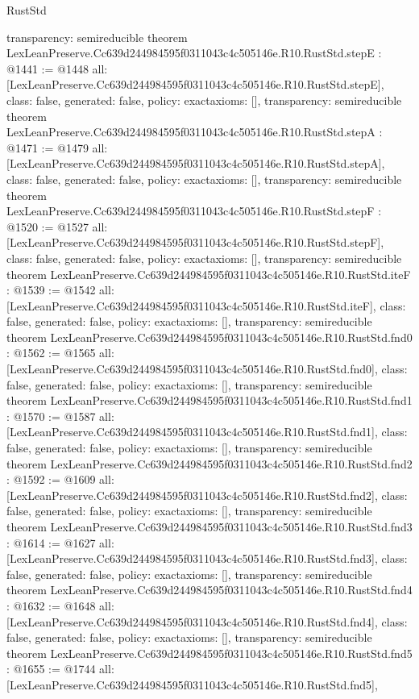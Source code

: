 \begin{lexlean}{RustStd}
\begin{coremodule}
{  transparency: semireducible
}
theorem LexLeanPreserve.Cc639d244984595f0311043c4c505146e.R10.RustStd.stepE : @1441 := @1448 {
  all: [LexLeanPreserve.Cc639d244984595f0311043c4c505146e.R10.RustStd.stepE],
  class: false,
  generated: false,
  policy: exact{axioms: []},
  transparency: semireducible
}
theorem LexLeanPreserve.Cc639d244984595f0311043c4c505146e.R10.RustStd.stepA : @1471 := @1479 {
  all: [LexLeanPreserve.Cc639d244984595f0311043c4c505146e.R10.RustStd.stepA],
  class: false,
  generated: false,
  policy: exact{axioms: []},
  transparency: semireducible
}
theorem LexLeanPreserve.Cc639d244984595f0311043c4c505146e.R10.RustStd.stepF : @1520 := @1527 {
  all: [LexLeanPreserve.Cc639d244984595f0311043c4c505146e.R10.RustStd.stepF],
  class: false,
  generated: false,
  policy: exact{axioms: []},
  transparency: semireducible
}
theorem LexLeanPreserve.Cc639d244984595f0311043c4c505146e.R10.RustStd.iteF : @1539 := @1542 {
  all: [LexLeanPreserve.Cc639d244984595f0311043c4c505146e.R10.RustStd.iteF],
  class: false,
  generated: false,
  policy: exact{axioms: []},
  transparency: semireducible
}
theorem LexLeanPreserve.Cc639d244984595f0311043c4c505146e.R10.RustStd.fnd0 : @1562 := @1565 {
  all: [LexLeanPreserve.Cc639d244984595f0311043c4c505146e.R10.RustStd.fnd0],
  class: false,
  generated: false,
  policy: exact{axioms: []},
  transparency: semireducible
}
theorem LexLeanPreserve.Cc639d244984595f0311043c4c505146e.R10.RustStd.fnd1 : @1570 := @1587 {
  all: [LexLeanPreserve.Cc639d244984595f0311043c4c505146e.R10.RustStd.fnd1],
  class: false,
  generated: false,
  policy: exact{axioms: []},
  transparency: semireducible
}
theorem LexLeanPreserve.Cc639d244984595f0311043c4c505146e.R10.RustStd.fnd2 : @1592 := @1609 {
  all: [LexLeanPreserve.Cc639d244984595f0311043c4c505146e.R10.RustStd.fnd2],
  class: false,
  generated: false,
  policy: exact{axioms: []},
  transparency: semireducible
}
theorem LexLeanPreserve.Cc639d244984595f0311043c4c505146e.R10.RustStd.fnd3 : @1614 := @1627 {
  all: [LexLeanPreserve.Cc639d244984595f0311043c4c505146e.R10.RustStd.fnd3],
  class: false,
  generated: false,
  policy: exact{axioms: []},
  transparency: semireducible
}
theorem LexLeanPreserve.Cc639d244984595f0311043c4c505146e.R10.RustStd.fnd4 : @1632 := @1648 {
  all: [LexLeanPreserve.Cc639d244984595f0311043c4c505146e.R10.RustStd.fnd4],
  class: false,
  generated: false,
  policy: exact{axioms: []},
  transparency: semireducible
}
theorem LexLeanPreserve.Cc639d244984595f0311043c4c505146e.R10.RustStd.fnd5 : @1655 := @1744 {
  all: [LexLeanPreserve.Cc639d244984595f0311043c4c505146e.R10.RustStd.fnd5],
}
\end{coremodule}
\end{lexlean}
